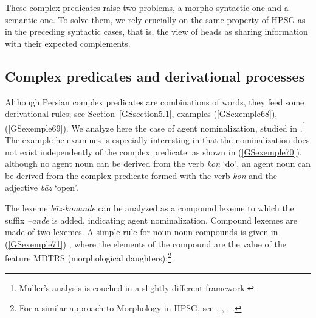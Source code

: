 \documentclass[output=paper
                ,modfonts
                ,nonflat
	        ,collection
	        ,collectionchapter
	        ,collectiontoclongg
 	        ,biblatex
                ,babelshorthands
                ,newtxmath
                ,draftmode
                ,colorlinks, citecolor=brown
]{./langsci/langscibook}
\begin{document}
{These complex predicates raise two problems, a morpho-syntactic one and a semantic one. To solve them, we rely crucially on the same property of HPSG as in the preceding syntactic cases, that is, the view of heads as sharing information with their expected complements. 

\subsection{Complex predicates and derivational processes}\label{GSsection5.2}

Although Persian complex predicates are combinations of words, they feed some derivational rules; see Section~\ref{GSsection5.1}, examples (\ref{GSexemple68}), (\ref{GSexemple69}). We analyze here the case of agent nominalization, studied in \cite{MuellerPersian-unlinked}.\footnote{Müller’s analysis is couched in a slightly different framework.} The example he examines is especially interesting in that the nominalization does not exist independently of the complex predicate: as shown in (\ref{GSexemple70}), although no agent noun can be derived from the verb \emph{kon} `do', an agent noun can be derived from the complex predicate formed with the verb \emph{kon} and the adjective \emph{b\=az} `open'.


\begin{exe}
\end{exe}

The lexeme \emph{b\=az-konande} can be analyzed as a compound lexeme to which the suffix \emph{–ande} is added, indicating agent nominalization. Compound lexemes are made of two lexemes. A simple rule for noun-noun compounds is given in (\ref{GSexemple71}) \citep{bonami2018lexeme}, where the elements of the compound are the value of the feature MDTRS (morphological daughters):\footnote{For a similar approach to Morphology in HPSG, see \cite{Orgun96a}, \cite{Riehemann98a}, \cite{Koenig99a}, \cite{sag2003syntactic}.}

\begin{exe}
\end{exe}

}
\end{document}
